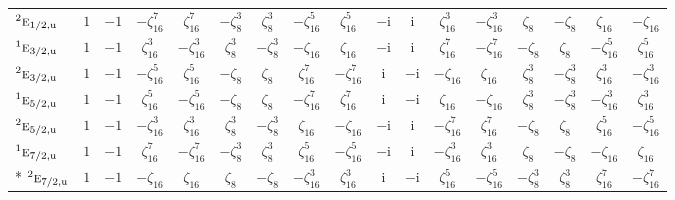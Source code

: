 \documentclass[10pt,a4paper]{article}
\numberwithin{equation}{section}
\newcommand{\irr}[1]{\text{\normalfont\scshape #1}}
\newcommand{\conjpair}[1]{{}^{#1}}
\newcommand{\ptag}[1]{\mathrm{#1}}
\newcommand{\iunit}{\mathrm{i}}
\newcommand{\rootunity}[1]{\zeta_{#1}}
\begin{document}
{\begin{longtable}{@{}lcccccccccccccccc@{}}
$\conjpair{2}\irr{e}_{1/2,\ptag{u}}$ & $1$ & $-1$ & $-\rootunity{16}^{7}$ & $\rootunity{16}^{7}$ & $-\rootunity{8}^{3}$ & $\rootunity{8}^{3}$ & $-\rootunity{16}^{5}$ & $\rootunity{16}^{5}$ & $-\iunit{}$ & $\iunit{}$ & $\rootunity{16}^{3}$ & $-\rootunity{16}^{3}$ & $\rootunity{8}$ & $-\rootunity{8}$ & $\rootunity{16}$ & $-\rootunity{16}$\\
$\conjpair{1}\irr{e}_{3/2,\ptag{u}}$ & $1$ & $-1$ & $\rootunity{16}^{3}$ & $-\rootunity{16}^{3}$ & $\rootunity{8}^{3}$ & $-\rootunity{8}^{3}$ & $-\rootunity{16}$ & $\rootunity{16}$ & $-\iunit{}$ & $\iunit{}$ & $\rootunity{16}^{7}$ & $-\rootunity{16}^{7}$ & $-\rootunity{8}$ & $\rootunity{8}$ & $-\rootunity{16}^{5}$ & $\rootunity{16}^{5}$\\
$\conjpair{2}\irr{e}_{3/2,\ptag{u}}$ & $1$ & $-1$ & $-\rootunity{16}^{5}$ & $\rootunity{16}^{5}$ & $-\rootunity{8}$ & $\rootunity{8}$ & $\rootunity{16}^{7}$ & $-\rootunity{16}^{7}$ & $\iunit{}$ & $-\iunit{}$ & $-\rootunity{16}$ & $\rootunity{16}$ & $\rootunity{8}^{3}$ & $-\rootunity{8}^{3}$ & $\rootunity{16}^{3}$ & $-\rootunity{16}^{3}$\\
$\conjpair{1}\irr{e}_{5/2,\ptag{u}}$ & $1$ & $-1$ & $\rootunity{16}^{5}$ & $-\rootunity{16}^{5}$ & $-\rootunity{8}$ & $\rootunity{8}$ & $-\rootunity{16}^{7}$ & $\rootunity{16}^{7}$ & $\iunit{}$ & $-\iunit{}$ & $\rootunity{16}$ & $-\rootunity{16}$ & $\rootunity{8}^{3}$ & $-\rootunity{8}^{3}$ & $-\rootunity{16}^{3}$ & $\rootunity{16}^{3}$\\
$\conjpair{2}\irr{e}_{5/2,\ptag{u}}$ & $1$ & $-1$ & $-\rootunity{16}^{3}$ & $\rootunity{16}^{3}$ & $\rootunity{8}^{3}$ & $-\rootunity{8}^{3}$ & $\rootunity{16}$ & $-\rootunity{16}$ & $-\iunit{}$ & $\iunit{}$ & $-\rootunity{16}^{7}$ & $\rootunity{16}^{7}$ & $-\rootunity{8}$ & $\rootunity{8}$ & $\rootunity{16}^{5}$ & $-\rootunity{16}^{5}$\\
$\conjpair{1}\irr{e}_{7/2,\ptag{u}}$ & $1$ & $-1$ & $\rootunity{16}^{7}$ & $-\rootunity{16}^{7}$ & $-\rootunity{8}^{3}$ & $\rootunity{8}^{3}$ & $\rootunity{16}^{5}$ & $-\rootunity{16}^{5}$ & $-\iunit{}$ & $\iunit{}$ & $-\rootunity{16}^{3}$ & $\rootunity{16}^{3}$ & $\rootunity{8}$ & $-\rootunity{8}$ & $-\rootunity{16}$ & $\rootunity{16}$\\*
$\conjpair{2}\irr{e}_{7/2,\ptag{u}}$ & $1$ & $-1$ & $-\rootunity{16}$ & $\rootunity{16}$ & $\rootunity{8}$ & $-\rootunity{8}$ & $-\rootunity{16}^{3}$ & $\rootunity{16}^{3}$ & $\iunit{}$ & $-\iunit{}$ & $\rootunity{16}^{5}$ & $-\rootunity{16}^{5}$ & $-\rootunity{8}^{3}$ & $\rootunity{8}^{3}$ & $\rootunity{16}^{7}$ & $-\rootunity{16}^{7}$\\
\bottomrule\end{longtable}}
\end{document}
